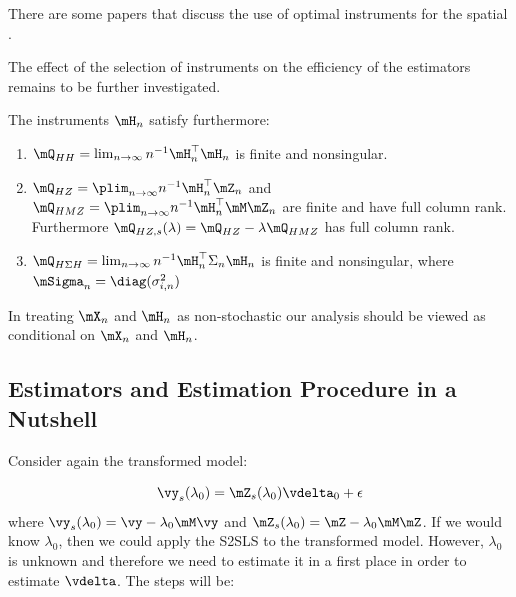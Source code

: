 \documentclass[english,12pt]{book}\usepackage[]{graphicx}\usepackage[]{xcolor}
\begin{document}
There are some papers that discuss the use of optimal instruments for the spatial \citep[see for example][]{lee2003best, das2003finite, Keliejian2004, lee2007gmm}.

\begin{remark}
The effect of the selection of instruments on the efficiency of the estimators remains to be further investigated.
\end{remark}

\begin{assumption}\label{assumption:instruments-arraiz} 

The instruments $\mH_n$ satisfy furthermore:

\begin{enumerate}
\item $\mQ_{HH} = \lim_{n \to \infty}n^{-1}\mH_n^\top\mH_n$ is finite and nonsingular.
\item $\mQ_{HZ} = \plim_{n \to \infty}n^{-1}\mH_n^\top\mZ_n$ and $\mQ_{HMZ} = \plim_{n \to \infty}n^{-1}\mH_n^\top\mM\mZ_n$ are finite and have full column rank. Furthermore $\mQ_{HZ,s}(\lambda) = \mQ_{HZ}-\lambda \mQ_{HMZ}$ has full column rank.
\item $\mQ_{H\Sigma H} = \lim_{n \to \infty}n^{-1}\mH_n^\top\Sigma_n\mH_n$ is finite and nonsingular, where $\mSigma_n= \diag(\sigma^2_{i,n})$
\end{enumerate}
\end{assumption}

In treating $\mX_n$ and $\mH_n$ as non-stochastic our analysis should be viewed as conditional on $\mX_n$ and $\mH_n$.


\subsection{Estimators and Estimation Procedure in a Nutshell}

Consider again the transformed model:

\begin{equation*}
  \vy_s(\lambda_0) = \mZ_s(\lambda_0)\vdelta_0 + \epsilon
\end{equation*}
%
where $\vy_s(\lambda_0) = \vy - \lambda_0\mM\vy$ and $\mZ_s(\lambda_0) = \mZ - \lambda_0\mM\mZ$. If we would know $\lambda_0$, then we could apply the S2SLS to the transformed model. However, $\lambda_0$ is unknown and therefore we need to estimate it in a first place in order to estimate $\vdelta$. The steps will be:
\end{document}
